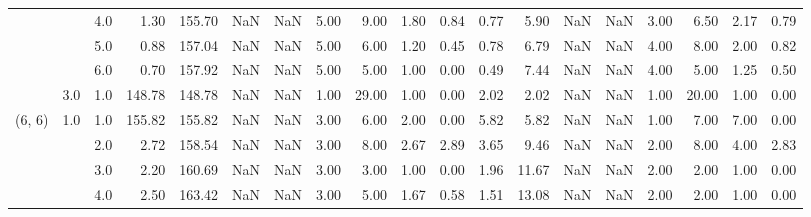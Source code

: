 \begin{tabular}{lllrrrrrrrrrrrrrrrr}
       &     & 4.0  &      1.30 &     155.70 &               NaN &                NaN &  5.00 &   9.00 &             1.80 &                         0.84 &      0.77 &       5.90 &               NaN &                NaN &  3.00 &   6.50 &             2.17 &                         0.79 \\
       &     & 5.0  &      0.88 &     157.04 &               NaN &                NaN &  5.00 &   6.00 &             1.20 &                         0.45 &      0.78 &       6.79 &               NaN &                NaN &  4.00 &   8.00 &             2.00 &                         0.82 \\
       &     & 6.0  &      0.70 &     157.92 &               NaN &                NaN &  5.00 &   5.00 &             1.00 &                         0.00 &      0.49 &       7.44 &               NaN &                NaN &  4.00 &   5.00 &             1.25 &                         0.50 \\
       & 3.0 & 1.0  &    148.78 &     148.78 &               NaN &                NaN &  1.00 &  29.00 &             1.00 &                         0.00 &      2.02 &       2.02 &               NaN &                NaN &  1.00 &  20.00 &             1.00 &                         0.00 \\
(6, 6) & 1.0 & 1.0  &    155.82 &     155.82 &               NaN &                NaN &  3.00 &   6.00 &             2.00 &                         0.00 &      5.82 &       5.82 &               NaN &                NaN &  1.00 &   7.00 &             7.00 &                         0.00 \\
       &     & 2.0  &      2.72 &     158.54 &               NaN &                NaN &  3.00 &   8.00 &             2.67 &                         2.89 &      3.65 &       9.46 &               NaN &                NaN &  2.00 &   8.00 &             4.00 &                         2.83 \\
       &     & 3.0  &      2.20 &     160.69 &               NaN &                NaN &  3.00 &   3.00 &             1.00 &                         0.00 &      1.96 &      11.67 &               NaN &                NaN &  2.00 &   2.00 &             1.00 &                         0.00 \\
       &     & 4.0  &      2.50 &     163.42 &               NaN &                NaN &  3.00 &   5.00 &             1.67 &                         0.58 &      1.51 &      13.08 &               NaN &                NaN &  2.00 &   2.00 &             1.00 &                         0.00 \\

\end{tabular}
